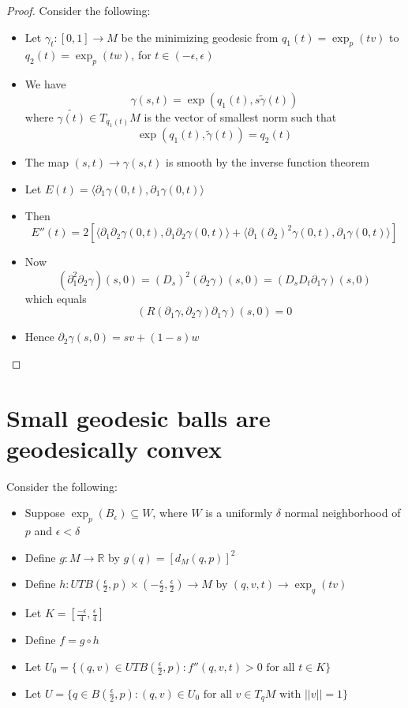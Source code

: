 \documentclass[a4paper,11pt]{article}
\begin{document}
\begin{proof}
  Consider the following:
  \begin{itemize}
    \item Let $\gamma_t:[0,1] \to M$ be the minimizing geodesic from $q_1(t)=\exp_p(tv)$ to $q_2(t)=\exp_p(tw)$, for $t \in (-\epsilon,\epsilon)$
    \item We have \[\gamma(s,t)=\exp(q_1(t),s \widetilde{\gamma}(t))\] where $\widetilde{\gamma(t)} \in T_{q_1(t)}M$ is the vector of smallest norm such that \[\exp(q_1(t),\widetilde{\gamma}(t))=q_2(t)\]
    \item The map $(s,t) \to \gamma(s,t)$ is smooth by the inverse function theorem
    \item Let $E(t)=\langle \partial_1 \gamma(0,t) , \partial_1 \gamma(0,t) \rangle $
    \item Then \[E''(t)=2 [ \langle \partial_1 \partial_2     \gamma(0,t),  \partial_1 \partial_2 \gamma(0,t) \rangle + 
                            \langle \partial_1 (\partial_2)^2 \gamma(0,t) , \partial_1 \gamma(0,t)            \rangle ] \]
    \item Now \[(\partial_1^2 \partial_2 \gamma)(s,0)=(D_s)^2 (\partial_2 \gamma)(s,0)=(D_s D_t \partial_1 \gamma)(s,0)\]
          which equals \[(R(\partial_1 \gamma,\partial_2 \gamma) \partial_1 \gamma)(s,0)=0\]
    \item Hence $\partial_2 \gamma (s,0)= sv+(1-s)w$
  \end{itemize}
\end{proof}

\section{Small geodesic balls are geodesically convex}

Consider the following:

\begin{itemize}
  \item Suppose $\exp_p(B_\epsilon) \subseteq W$, where $W$ is a uniformly $\delta$ normal neighborhood of $p$ and $\epsilon < \delta$
  \item Define $g:M \to \mathbb{R}$ by $g(q)=[d_M(q,p)]^2$
  \item Define $h:UTB(\frac{\epsilon}{2},p) \times (-\frac{\epsilon}{2},\frac{\epsilon}{2}) \to M$ by $(q,v,t) \to \exp_q(tv)$
  \item Let $K=[\frac{-\epsilon}{4},\frac{\epsilon}{4}]$
  \item Define $f=g \circ h$
  \item Let $U_0=\{(q,v) \in UTB(\frac{\epsilon}{2},p) :f''(q,v,t)>0 \text{ for all }t \in K\}$
  \item Let $U=\{q \in B(\frac{\epsilon}{2},p): (q,v) \in U_0 \text{ for all } v \in T_qM \text{ with } ||v||=1 \}$
\end{itemize}
\end{document}
